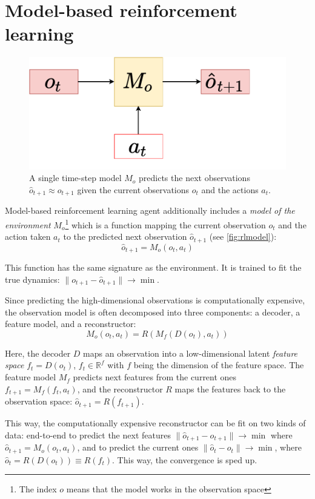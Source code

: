 \documentclass[a4paper,11pt,oneside]{report}
\begin{document}
\section{Model-based reinforcement learning}
\label{sec:mbrl}
\begin{figure}
    \centering
    \includegraphics[width=0.5\linewidth]{diagrams/rl_model}
    \caption{A single time-step model $M_o$ predicts the next observations $\hat{o}_{t+1}\approx o_{t+1}$ given the current observations $o_t$ and the actions $a_t$.}
    \label{fig:rlmodel}
\end{figure}


Model-based reinforcement learning \cite{DeBruin2018,Corneil2018,Kaiser2019} agent additionally includes a {\em model of the environment} $M_o$\footnote{The index $o$ means that the model works in the observation space} which is a function mapping the current observation $o_t$ and the action taken $a_t$ to the predicted next observation $\hat{o}_{t+1}$ (see \autoref{fig:rlmodel}):
$$
\hat{o}_{t+1}=M_o(o_t, a_t)
$$

This function has the same signature as the environment. It is trained to fit the true dynamics: $\|o_{t+1}-\hat{o}_{t+1}\|\to\min$.

Since predicting the high-dimensional observations is computationally expensive, the observation model is often decomposed into three components: a decoder, a feature model, and a reconstructor:
$$
M_o(o_t, a_t)=R(M_f(D(o_t), a_t))
$$

Here, the decoder $D$ maps an observation into a low-dimensional latent {\em feature space} $f_t=D(o_t)$, $f_t\in \mathbb R^f$ with $f$ being the dimension of the feature space. The feature model $M_f$ predicts next features from the current ones $f_{t+1}=M_f(f_t,a_t)$, and the reconstructor $R$ maps the features back to the observation space: $\hat{o}_{t+1}=R(f_{t+1})$.

This way, the computationally expensive reconstructor can be fit on two kinds of data: end-to-end to predict the next features $\|\hat{o}_{t+1}-o_{t+1}\|\to\min$ where $\hat{o}_{t+1}=M_o(o_t, a_t)$, and to predict the current ones $\|\hat{o}_t-o_t\|\to\min$, where $\hat{o}_t=R(D(o_t))\equiv R(f_t)$. This way, the convergence is sped up.
\end{document}
